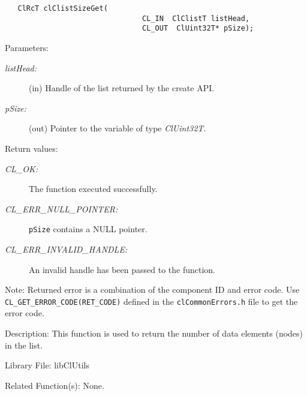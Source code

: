 \begin{flushleft}
\begin{Desc}
\footnotesize\begin{verbatim}   ClRcT clClistSizeGet(
                     			CL_IN  ClClistT listHead,
                     			CL_OUT  ClUint32T* pSize);
\end{verbatim}
\normalsize
\end{Desc}
\begin{Desc}
\item[Parameters:]
\begin{description}
\item[{\em list\-Head:}](in) Handle of the list returned by the create API. 
\item[{\em p\-Size:}](out) Pointer to the variable of type {\em Cl\-Uint32T\/}.\end{description}
\end{Desc}
\begin{Desc}
\item[Return values:]
\begin{description}
\item[{\em CL\_\-OK:}]The function executed successfully. 
\item[{\em CL\_\-ERR\_\-NULL\_\-POINTER:}]{\tt{pSize}} contains a NULL pointer. 
\item[{\em CL\_\-ERR\_\-INVALID\_\-HANDLE:}]An invalid handle has been passed to the function.
\end{description}
\end{Desc}
\begin{Desc}
\item[Note:]Returned error is a combination of the component ID and error code. Use {\tt{CL\_\-GET\_\-ERROR\_\-CODE(RET\_\-CODE)}} defined in
the {\tt{clCommonErrors.h}} file to get the error code.\end{Desc}
\begin{Desc}
\item[Description:]This function is used to return the number of data elements (nodes) in the list.\end{Desc}
\begin{Desc}
\item[Library File:]lib\-Cl\-Utils\end{Desc}
\begin{Desc}
\item[Related Function(s):]None. \end{Desc}
\newpage



\end{flushleft}
